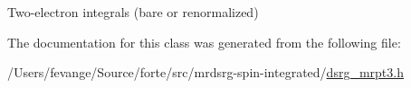Two-\/electron integrals (bare or renormalized) 



The documentation for this class was generated from the following file\+:\begin{DoxyCompactItemize}
\item 
/\+Users/fevange/\+Source/forte/src/mrdsrg-\/spin-\/integrated/\mbox{\hyperlink{dsrg__mrpt3_8h}{dsrg\+\_\+mrpt3.\+h}}\end{DoxyCompactItemize}
